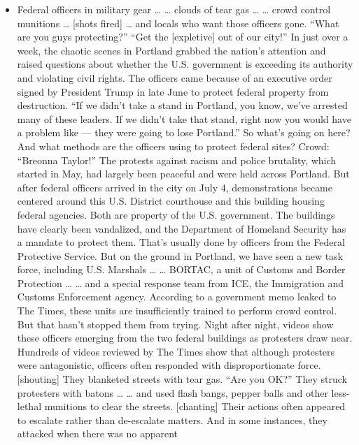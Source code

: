\begin{itemize}
\tightlist
\item
  Federal officers in military gear \ldots{} \ldots{} clouds of tear gas
  \ldots{} \ldots{} crowd control munitions \ldots{} {[}shots fired{]}
  \ldots{} and locals who want those officers gone. ``What are you guys
  protecting?'' ``Get the {[}expletive{]} out of our city!'' In just
  over a week, the chaotic scenes in Portland grabbed the nation's
  attention and raised questions about whether the U.S. government is
  exceeding its authority and violating civil rights. The officers came
  because of an executive order signed by President Trump in late June
  to protect federal property from destruction. ``If we didn't take a
  stand in Portland, you know, we've arrested many of these leaders. If
  we didn't take that stand, right now you would have a problem like ---
  they were going to lose Portland.'' So what's going on here? And what
  methods are the officers using to protect federal sites? Crowd:
  ``Breonna Taylor!'' The protests against racism and police brutality,
  which started in May, had largely been peaceful and were held across
  Portland. But after federal officers arrived in the city on July 4,
  demonstrations became centered around this U.S. District courthouse
  and this building housing federal agencies. Both are property of the
  U.S. government. The buildings have clearly been vandalized, and the
  Department of Homeland Security has a mandate to protect them. That's
  usually done by officers from the Federal Protective Service. But on
  the ground in Portland, we have seen a new task force, including U.S.
  Marshals \ldots{} \ldots{} BORTAC, a unit of Customs and Border
  Protection \ldots{} \ldots{} and a special response team from ICE, the
  Immigration and Customs Enforcement agency. According to a government
  memo leaked to The Times, these units are insufficiently trained to
  perform crowd control. But that hasn't stopped them from trying. Night
  after night, videos show these officers emerging from the two federal
  buildings as protesters draw near. Hundreds of videos reviewed by The
  Times show that although protesters were antagonistic, officers often
  responded with disproportionate force. {[}shouting{]} They blanketed
  streets with tear gas. ``Are you OK?'' They struck protesters with
  batons \ldots{} \ldots{} and used flash bangs, pepper balls and other
  less-lethal munitions to clear the streets. {[}chanting{]} Their
  actions often appeared to escalate rather than de-escalate matters.
  And in some instances, they attacked when there was no apparent

\end{itemize}
